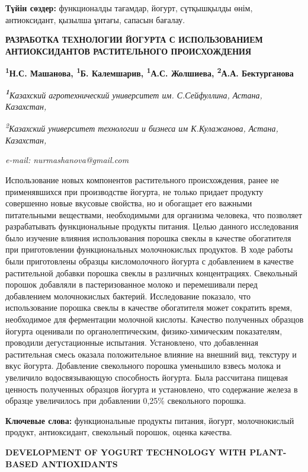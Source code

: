 {\bfseries Түйін сөздер:} функционалды тағамдар, йогурт, сүтқышқылды өнім,
антиоксидант, қызылша ұнтағы, сапасын бағалау.

{\bfseries РАЗРАБОТКА ТЕХНОЛОГИИ ЙОГУРТА С ИСПОЛЬЗОВАНИЕМ АНТИОКСИДАНТОВ
РАСТИТЕЛЬНОГО ПРОИСХОЖДЕНИЯ}

{\bfseries \textsuperscript{1}Н.С. Машанова, \textsuperscript{1}Б.
Калемшарив, \textsuperscript{1}А.С. Жолшиева, \textsuperscript{2}А.А.
Бектурганова}

\emph{{\bfseries \textsuperscript{1}}Казахский агротехнический университет
им. С.Сейфуллина, Астана, Казахстан,}

\emph{\textsuperscript{2}Казахский университет технологии и бизнеса им
К.Кулажанова, Астана, Казахстан,}

\emph{e-mail: nurmashanova@gmail.com}

Использование новых компонентов растительного происхождения, ранее не
применявшихся при производстве йогурта, не только придает продукту
совершенно новые вкусовые свойства, но и обогащает его важными
питательными веществами, необходимыми для организма человека, что
позволяет разрабатывать функциональные продукты питания. Целью данного
исследования было изучение влияния использования порошка свеклы в
качестве обогатителя при приготовлении функциональных молочнокислых
продуктов. В ходе работы были приготовлены образцы кисломолочного
йогурта с добавлением в качестве растительной добавки порошка свеклы в
различных концентрациях. Свекольный порошок добавляли в пастеризованное
молоко и перемешивали перед добавлением молочнокислых бактерий.
Исследование показало, что использование порошка свеклы в качестве
обогатителя может сократить время, необходимое для ферментации молочной
кислоты. Качество полученных образцов йогурта оценивали по
органолептическим, физико-химическим показателям, проводили
дегустационные испытания. Установлено, что добавленная растительная
смесь оказала положительное влияние на внешний вид, текстуру и вкус
йогурта. Добавление свекольного порошка уменьшило взвесь молока и
увеличило водосвязывающую способность йогурта. Была рассчитана пищевая
ценность полученных образцов йогурта и установлено, что содержание
железа в образце увеличилось при добавлении 0,25\% свекольного порошка.

{\bfseries Ключевые слова:} функциональные продукты питания, йогурт,
молочнокислый продукт, антиоксидант, свекольный порошок, оценка
качества.

{\bfseries DEVELOPMENT OF YOGURT TECHNOLOGY WITH PLANT-BASED ANTIOXIDANTS}

